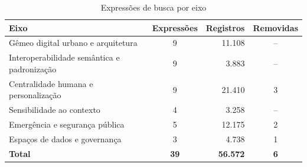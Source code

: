 \begin{table}[htb]
\centering
\caption{Expressões de busca por eixo}
\label{tab:expressoes}
\scriptsize
\begin{tabularx}{\textwidth}{@{}X c r c@{}}
\toprule
\textbf{Eixo} & \textbf{Expressões} & \textbf{Registros} & \textbf{Removidas} \\
\midrule
Gêmeo digital urbano e arquitetura & 9 & 11.108 & -- \\
Interoperabilidade semântica e padronização & 9 & 3.883 & -- \\
Centralidade humana e personalização & 9 & 21.410 & 3 \\
Sensibilidade ao contexto & 4 & 3.258 & -- \\
Emergência e segurança pública & 5 & 12.175 & 2 \\
Espaços de dados e governança & 3 & 4.738 & 1 \\
\midrule
\textbf{Total} & \textbf{39} & \textbf{56.572} & \textbf{6} \\
\bottomrule
\end{tabularx}
\end{table}
